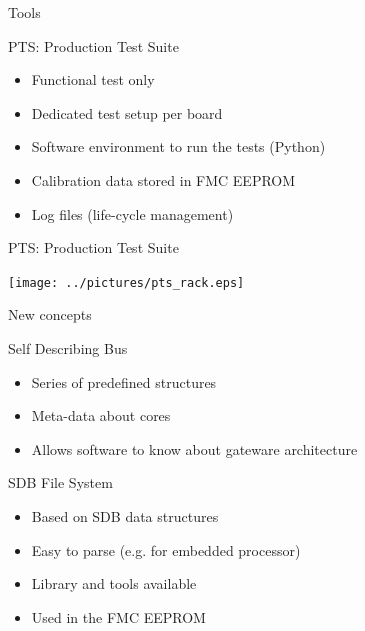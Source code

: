 \documentclass[compress,red]{beamer}
\begin{document}
\begin{frame}{Tools}

  \begin{block}{PTS: Production Test Suite}
    \begin{itemize}
    \item Functional test only
    \item Dedicated test setup per board
    \item Software environment to run the tests (Python)
    \item Calibration data stored in FMC EEPROM
    \item Log files (life-cycle management)
    \end{itemize}
  \end{block}

\end{frame}

\begin{frame}{PTS: Production Test Suite}

  \begin{center}
    \texttt{[image: ../pictures/pts\_rack.eps]}
  \end{center}

\end{frame}

\begin{frame}{New concepts}

  \begin{block}{Self Describing Bus}
    \begin{itemize}
    \item Series of predefined structures
    \item Meta-data about cores
    \item Allows software to know about gateware architecture
    \end{itemize}
  \end{block}

  \begin{block}{SDB File System}
    \begin{itemize}
    \item Based on SDB data structures
    \item Easy to parse (e.g. for embedded processor)
    \item Library and tools available %
    \item Used in the FMC EEPROM
    \end{itemize}
  \end{block}

\end{frame}
\end{document}
